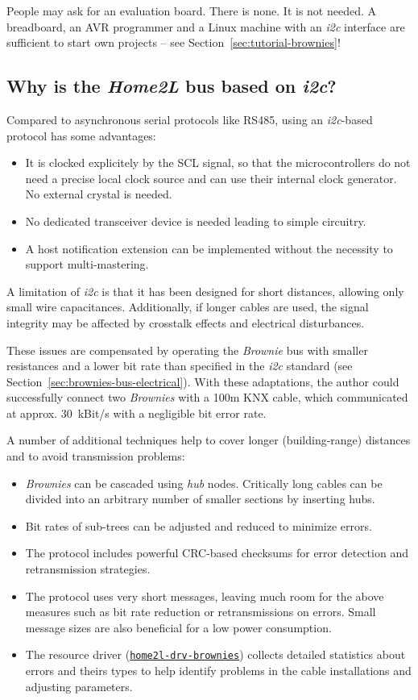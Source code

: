 \documentclass[12pt,english,parskip=half,headheight=19pt]{scrreprt}
\newcommand{\idx}[1]{#1\index{#1}}
\newcommand{\reftool}[1]{\hyperref[tool:#1]{\texttt{\idx{#1}}}}
\begin{document}
People may ask for an evaluation board. There is none. It is not needed. A breadboard, an AVR programmer and a Linux machine with an \textit{i2c} interface are sufficient to start own projects -- see Section~\ref{sec:tutorial-brownies}!



\subsection*{Why is the \textit{Home2L} bus based on \textit{i2c}?}

Compared to asynchronous serial protocols like RS485, using an \textit{i2c}-based protocol has some advantages:
\begin{itemize}
  \item It is clocked explicitely by the SCL signal, so that the microcontrollers do not need a precise
        local clock source and can use their internal clock generator. No external crystal is needed.
  \item No dedicated transceiver device is needed leading to simple circuitry.
  \item A host notification extension can be implemented without the necessity to support
        multi-mastering.
\end{itemize}

A limitation of \textit{i2c} is that it has been designed for short distances, allowing only small wire capacitances. Additionally, if longer cables are used, the signal integrity may be affected by crosstalk effects and electrical disturbances.

These issues are compensated by operating the \textit{Brownie} bus with smaller resistances and a lower bit rate than specified in the \textit{i2c} standard (see Section~\ref{sec:brownies-bus-electrical}). With these adaptations, the author could successfully connect two \textit{Brownies} with a 100m KNX cable, which communicated at approx. 30~kBit/s with a negligible bit error rate.

A number of additional techniques help to cover longer (building-range) distances and to avoid transmission problems:
\begin{itemize}
  \item \textit{Brownies} can be cascaded using \textit{hub} nodes. Critically long cables can be divided into an arbitrary number of smaller sections by inserting hubs.
  \item Bit rates of sub-trees can be adjusted and reduced to minimize errors.
  \item The protocol includes powerful CRC-based checksums for error detection and retransmission strategies.
  \item The protocol uses very short messages, leaving much room for the above measures such as bit rate reduction or retransmissions on errors. Small message sizes are also beneficial for a low power consumption.
  \item The resource driver (\reftool{home2l-drv-brownies}) collects detailed statistics about errors and theirs types to help identify problems in the cable installations and adjusting parameters.
\end{itemize}
\end{document}
